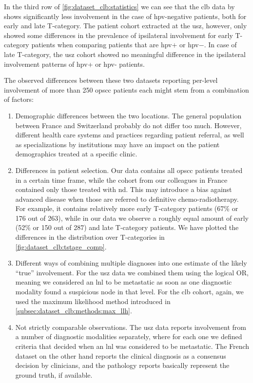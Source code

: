 \documentclass[\relativeRoot/main.tex]{subfiles}
\begin{document}
In the third row of \cref{fig:dataset_clb:statistics} we can see that the \gls{clb} data by  shows significantly less involvement in the case of \gls{hpv}-negative patients, both for early and late T-category. The patient cohort extracted at the \gls{usz}, however, only showed some differences in the prevalence of ipsilateral involvement for early T-category patients when comparing patients that are \gls{hpv}$+$ or \gls{hpv}$-$. In case of late T-category, the \gls{usz} cohort showed no meaningful difference in the ipsilateral involvement patterns of \gls{hpv}+ or \gls{hpv}- patients.

The observed differences between these two datasets reporting per-level involvement of more than 250 \gls{opscc} patients each might stem from a combination of factors:

\begin{enumerate}
    \item Demographic differences between the two locations. The general population between France and Switzerland probably do not differ too much. However, different health care systems and practices regarding patient referral, as well as specializations by institutions may have an impact on the patient demographics treated at a specific clinic.
    \item Differences in patient selection. Our data contains all \gls{opscc} patients treated in a certain time frame, while the cohort from our colleagues in France contained only those treated with \acrlong{nd}. This may introduce a bias against advanced disease when those are referred to definitive chemo-radiotherapy. For example, it contains relatively more early T-category patients (67\% or 176 out of 263), while in our data we observe a roughly equal amount of early (52\% or 150 out of 287) and late T-category patients. We have plotted the differences in the distribution over T-categories in \cref{fig:dataset_clb:tstage_comp}.
    \item Different ways of combining multiple diagnoses into one estimate of the likely ``true'' involvement. For the \gls{usz} data we combined them using the logical OR, meaning we considered an \gls{lnl} to be metastatic as soon as one diagnostic modality found a suspicious node in that level. For the \gls{clb} cohort, again, we used the maximum likelihood method introduced in \cref{subsec:dataset_clb:methods:max_llh}.
    \item Not strictly comparable observations. The \gls{usz} data reports involvement from a number of diagnostic modalities separately, where for each one we defined criteria that decided when an \gls{lnl} was considered to be metastatic. The French dataset on the other hand reports the clinical diagnosis as a consensus decision by clinicians, and the pathology reports basically represent the ground truth, if available.
\end{enumerate}
\end{document}
